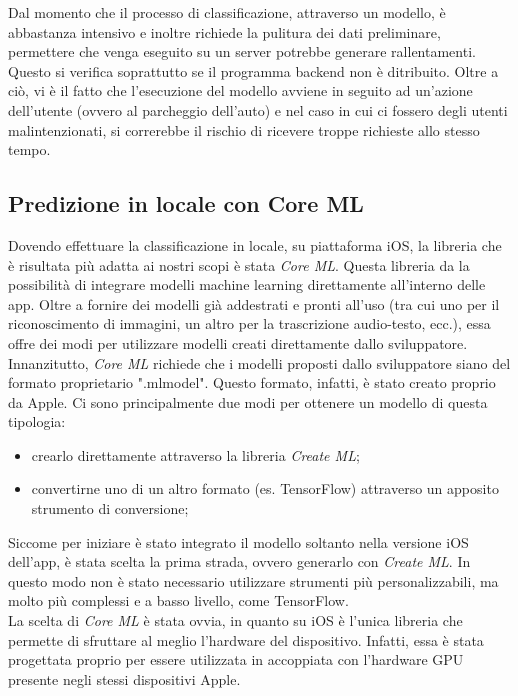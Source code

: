 Dal momento che il processo di classificazione, attraverso un modello, è 
abbastanza intensivo e inoltre richiede la pulitura dei dati preliminare,
permettere che venga eseguito su un server potrebbe generare rallentamenti.
Questo si verifica soprattutto se il programma backend non è ditribuito.
Oltre a ciò, vi è il fatto che l'esecuzione del modello avviene in seguito
ad un'azione dell'utente (ovvero al parcheggio dell'auto) e nel caso in cui 
ci fossero degli utenti malintenzionati, si correrebbe il rischio di
ricevere troppe richieste allo stesso tempo.

\subsection{Predizione in locale con Core ML}

Dovendo effettuare la classificazione in locale, su piattaforma iOS, la 
libreria che è risultata più adatta ai nostri scopi è stata \emph{Core ML}.
Questa libreria da la possibilità di integrare modelli machine learning 
direttamente all'interno delle app. Oltre a fornire dei modelli già 
addestrati e pronti all'uso (tra cui uno per il riconoscimento di immagini,
un altro per la trascrizione audio-testo, ecc.), essa offre dei modi per 
utilizzare modelli creati direttamente dallo sviluppatore.\\
Innanzitutto, \emph{Core ML} richiede che i modelli proposti dallo
sviluppatore siano del formato proprietario ".mlmodel". Questo formato,
infatti, è stato creato proprio da Apple. Ci sono principalmente due 
modi per ottenere un modello di questa tipologia:
\begin{itemize}
    \item crearlo direttamente attraverso la libreria \emph{Create ML};
    \item convertirne uno di un altro formato (es. TensorFlow) attraverso 
    un apposito strumento di conversione;
\end{itemize}
Siccome per iniziare è stato integrato il modello soltanto nella versione
iOS dell'app, è stata scelta la prima strada, ovvero generarlo con
\emph{Create ML}. In questo modo non è stato necessario utilizzare
strumenti più personalizzabili, ma molto più complessi e a basso
livello, come TensorFlow.\\
La scelta di \emph{Core ML} è stata ovvia, in quanto su iOS è l'unica
libreria che permette di sfruttare al meglio l'hardware del dispositivo.
Infatti, essa è stata progettata proprio per essere utilizzata in
accoppiata con l'hardware GPU presente negli stessi dispositivi Apple.
